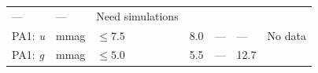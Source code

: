 \documentclass[DM,lsstdraft,toc]{lsstdoc}
\begin{document}
\begin{longtable}[]{@{}lllllll@{}}
\begin{minipage}[t]{0.12\columnwidth}
---\strut
\end{minipage} & \begin{minipage}[t]{0.12\columnwidth}\raggedright\strut
---\strut
\end{minipage} & \begin{minipage}[t]{0.17\columnwidth}\raggedright\strut
Need simulations\strut
\end{minipage}\tabularnewline
\begin{minipage}[t]{0.12\columnwidth}\raggedright\strut
PA1: \emph{u}\strut
\end{minipage} & \begin{minipage}[t]{0.06\columnwidth}\raggedright\strut
mmag\strut
\end{minipage} & \begin{minipage}[t]{0.14\columnwidth}\raggedright\strut
\(\leq 7.5\)\strut
\end{minipage} & \begin{minipage}[t]{0.14\columnwidth}\raggedright\strut
8.0\strut
\end{minipage} & \begin{minipage}[t]{0.12\columnwidth}\raggedright\strut
---\strut
\end{minipage} & \begin{minipage}[t]{0.12\columnwidth}\raggedright\strut
--- \strut
\end{minipage} & \begin{minipage}[t]{0.17\columnwidth}\raggedright\strut
No data\strut
\end{minipage}\tabularnewline
\begin{minipage}[t]{0.12\columnwidth}\raggedright\strut
PA1: \emph{g}\strut
\end{minipage} & \begin{minipage}[t]{0.06\columnwidth}\raggedright\strut
mmag\strut
\end{minipage} & \begin{minipage}[t]{0.14\columnwidth}\raggedright\strut
\(\leq 5.0\)\strut
\end{minipage} & \begin{minipage}[t]{0.14\columnwidth}\raggedright\strut
5.5\strut
\end{minipage} & \begin{minipage}[t]{0.12\columnwidth}\raggedright\strut
---\strut
\end{minipage} & \begin{minipage}[t]{0.12\columnwidth}\raggedright\strut
12.7 \strut
\end{minipage} & \begin{minipage}[t]{0.17\columnwidth}\raggedright\strut

\end{minipage}
\end{longtable}
\end{document}
